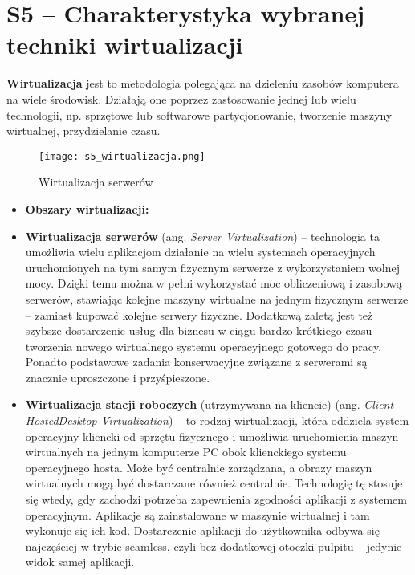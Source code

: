 \section{S5 -- Charakterystyka wybranej techniki wirtualizacji}

\textbf{Wirtualizacja} jest to metodologia polegająca na dzieleniu zasobów komputera na wiele środowisk. Działają one poprzez zastosowanie jednej lub wielu technologii, np. sprzętowe lub softwarowe partycjonowanie, tworzenie maszyny wirtualnej, przydzielanie czasu.

\begin{figure}[H]
	\centering
	\texttt{[image: s5\_wirtualizacja.png]}
	\caption{Wirtualizacja serwerów}
\end{figure}


\begin{itemize}
	\setlength\itemsep{1pt}
	\item \textbf{Obszary wirtualizacji:}
	\item \textbf{Wirtualizacja serwerów} (ang. \textit{Server Virtualization}) – technologia ta  umożliwia wielu aplikacjom działanie na wielu systemach operacyjnych uruchomionych na tym samym fizycznym serwerze z wykorzystaniem wolnej mocy. Dzięki temu można w pełni wykorzystać moc obliczeniową i zasobową serwerów, stawiając kolejne maszyny wirtualne na jednym fizycznym serwerze – zamiast kupować kolejne serwery fizyczne. Dodatkową zaletą jest też szybsze dostarczenie usług dla biznesu w ciągu bardzo krótkiego czasu tworzenia nowego wirtualnego systemu operacyjnego gotowego do pracy. Ponadto podstawowe zadania konserwacyjne związane z serwerami są znacznie uproszczone i przyśpieszone.
	\item \textbf{Wirtualizacja stacji roboczych} (utrzymywana na kliencie) (ang. \textit{Client-HostedDesktop Virtualization}) – to rodzaj wirtualizacji, która oddziela system operacyjny kliencki od sprzętu fizycznego i umożliwia uruchomienia maszyn wirtualnych na jednym komputerze PC obok klienckiego systemu operacyjnego hosta. Może być centralnie zarządzana, a obrazy maszyn wirtualnych mogą być dostarczane również centralnie. Technologię tę stosuje się wtedy, gdy zachodzi potrzeba zapewnienia zgodności aplikacji z systemem operacyjnym. Aplikacje są zainstalowane w maszynie wirtualnej i tam wykonuje się ich kod. Dostarczenie aplikacji do użytkownika odbywa się najczęściej w trybie seamless, czyli bez dodatkowej otoczki pulpitu – jedynie widok samej aplikacji.

\end{itemize}
